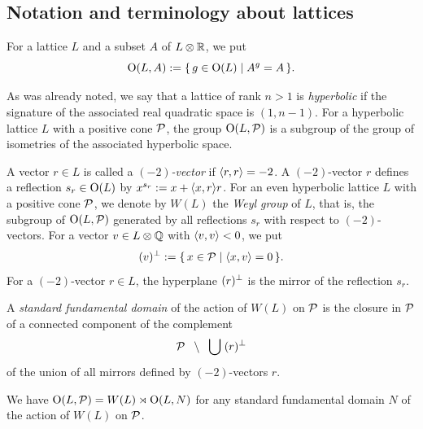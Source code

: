 \documentclass{amsart} %
\begin{document}
\subsection{Notation and terminology about lattices}\label{subsec:notationlat}
%
For a lattice $L$ and a subset $A$ of $L\otimes \mathord{\mathbb{R}}$,
we put
\[
\mathord{\mathrm{O}}(L, A):=\{\,{g\in \mathord{\mathrm{O}}(L)}\mid {A^g=A} \,\}.
\]
\par
As was already noted,
we say that a lattice of rank $n>1$ is \emph{hyperbolic}
if the signature of the associated real quadratic space is $(1, n-1)$.
For a hyperbolic lattice $L$ with a positive cone $\mathord{\mathcal{P}}$,
the group
$\mathord{\mathrm{O}}(L, \mathord{\mathcal{P}})$ is a subgroup of the group of isometries of the associated hyperbolic space.
\par %
A vector $r\in L$ is called a \emph{$(-2)$-vector} if $\langle r, r \rangle=-2$.
A $(-2)$-vector $r$ defines a reflection 
$s_r\in \mathord{\mathrm{O}}(L)$ by $x^{s_r}:=x+\langle x, r \rangle r$.
For an even hyperbolic lattice $L$ with a positive cone $\mathord{\mathcal{P}}$,
we denote by $W(L)$ the \emph{Weyl group} of $L$,
that is, the subgroup of $\mathord{\mathrm{O}}(L, \mathord{\mathcal{P}})$
generated by all reflections $s_r$ with respect to $(-2)$-vectors.
For a vector $v \in L\otimes\mathord{\mathbb{Q}}$ with $\langle v, v \rangle<0$,
we put 
\[
(v)^{\perp}:=\{\,{x\in \mathord{\mathcal{P}}}\mid {\langle x, v \rangle=0} \,\}.
\]
For a $(-2)$-vector $r\in L$, 
the hyperplane $(r)^{\perp}$ is the mirror of the 
reflection $s_r$.
%
\begin{definition}
A \emph{standard fundamental domain} of the action of $W(L)$ on $\mathord{\mathcal{P}}$
is the closure in $ \mathord{\mathcal{P}}$ of a connected component of the complement 
\[
\mathord{\mathcal{P}}\;\;\setminus \;\;\bigcup\; (r)^{\perp}
\]
of the union of all mirrors defined by $(-2)$-vectors $r$.
\end{definition}
%
We have $\mathord{\mathrm{O}}(L, \mathord{\mathcal{P}})=W(L)\rtimes \mathord{\mathrm{O}}(L, N)$
for any standard fundamental domain $N$ of the action of $W(L)$ on $\mathord{\mathcal{P}}$.
%
\end{document}
